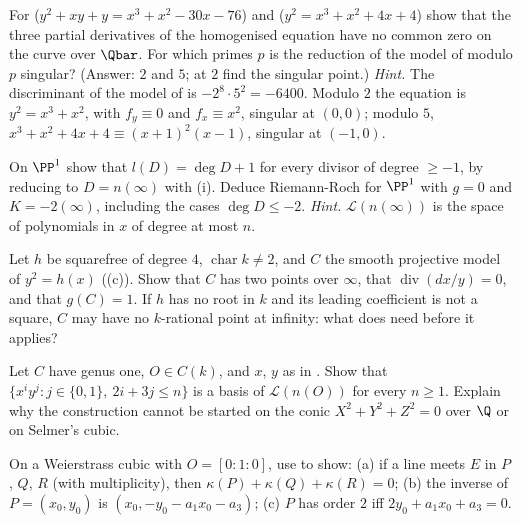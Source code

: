 \begin{exercise}\label{ex:curves:ex-smooth}
For  ($y^2+xy+y=x^3+x^2-30x-76$) and  ($y^2=x^3+x^2+4x+4$) show that the three partial derivatives of the homogenised equation have no common zero on the curve over
$\Qbar$. For which primes $p$ is the reduction of the model of  modulo $p$ singular? (Answer: $2$ and $5$; at $2$ find the singular point.)
\emph{Hint.} The discriminant of the model of  is $-2^8\cdot5^2=-6400$. Modulo $2$ the equation is $y^2=x^3+x^2$, with $f_y\equiv0$ and $f_x\equiv x^2$,
singular at $(0,0)$; modulo $5$, $x^3+x^2+4x+4\equiv(x+1)^2(x-1)$, singular at $(-1,0)$.
\end{exercise}

\begin{exercise}\label{ex:curves:ex-p1}
On $\PP^1$ show that $l(D)=\deg D+1$ for every divisor of degree $\ge-1$, by reducing to $D=n(\infty)$ with (i). Deduce Riemann-Roch for $\PP^1$ with $g=0$ and
$K=-2(\infty)$, including the cases $\deg D\le-2$. \emph{Hint.} $\mathcal L(n(\infty))$ is the space of polynomials in $x$ of degree at most $n$.
\end{exercise}

\begin{exercise}\label{ex:curves:ex-quartic-model}
Let $h$ be squarefree of degree $4$, $\operatorname{char}k\ne2$, and $C$ the smooth projective model of $y^2=h(x)$ ((c)). Show that $C$ has two points over $\infty$,
that $\operatorname{div}(dx/y)=0$, and that $g(C)=1$. If $h$ has no root in $k$ and its leading coefficient is not a square, $C$ may have no $k$-rational point at infinity: what does
 need before it applies?
\end{exercise}

\begin{exercise}\label{ex:curves:ex-bases}
Let $C$ have genus one, $O\in C(k)$, and $x$, $y$ as in . Show that $\{x^iy^j:j\in\{0,1\},\ 2i+3j\le n\}$ is a basis of $\mathcal L(n(O))$ for every
$n\ge1$. Explain why the construction cannot be started on the conic $X^2+Y^2+Z^2=0$ over $\Q$ or on Selmer's cubic.
\end{exercise}

\begin{exercise}\label{ex:curves:ex-chord}
On a Weierstrass cubic with $O=[0:1:0]$, use  to show: (a) if a line meets $E$ in $P$, $Q$, $R$ (with multiplicity), then $\kappa(P)+\kappa(Q)+\kappa(R)=0$; (b) the
inverse of $P=(x_0,y_0)$ is $(x_0,-y_0-a_1x_0-a_3)$; (c) $P$ has order $2$ iff $2y_0+a_1x_0+a_3=0$.
\end{exercise}

